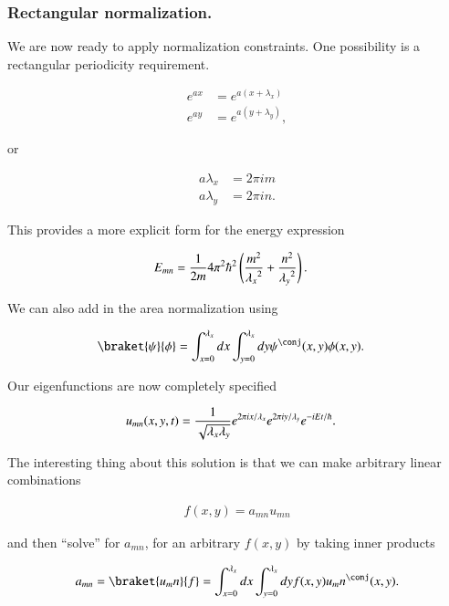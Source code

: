 \subsubsection{Rectangular normalization.}

We are now ready to apply normalization constraints.  One possibility is a rectangular periodicity requirement.

\begin{align}\label{eqn:desaiCh4:107}
e^{ax} &= e^{a(x + \lambda_x)} \\
e^{ay} &= e^{a(y + \lambda_y)} ,
\end{align}

or

\begin{align}\label{eqn:desaiCh4:108}
a\lambda_x &= 2 \pi i m \\
a\lambda_y &= 2 \pi i n.
\end{align}

This provides a more explicit form for the energy expression

\begin{align}\label{eqn:desaiCh4:109}
E_{mn} &= \frac{1}{2m} 4 \pi^2 \hbar^2 \left( 
\frac{m^2}{{\lambda_x}^2}
+\frac{n^2}{{\lambda_y}^2}
\right).
\end{align}

We can also add in the area normalization using 

\begin{align}\label{eqn:desaiCh4:110}
\braket{\psi}{\phi} &= 
\int_{x=0}^{\lambda_x} dx
\int_{y=0}^{\lambda_x} dy \psi^\conj(x,y) \phi(x,y).
\end{align}

Our eigenfunctions are now completely specified

\begin{align}\label{eqn:desaiCh4:111}
u_{mn}(x,y,t) &= \frac{1}{\sqrt{\lambda_x \lambda_y}}
e^{2 \pi i x/\lambda_x}
e^{2 \pi i y/\lambda_y}
e^{-iE t/\hbar}.
\end{align}

The interesting thing about this solution is that we can make arbitrary linear combinations

\begin{align}\label{eqn:desaiCh4:112}
f(x,y) = a_{mn} u_{mn}
\end{align}

and then ``solve'' for $a_{mn}$, for an arbitrary $f(x,y)$ by taking inner products

\begin{align}\label{eqn:desaiCh4:113}
a_{mn} = \braket{u_mn}{f} =
\int_{x=0}^{\lambda_x} dx 
\int_{y=0}^{\lambda_x} dy f(x,y) u_mn^\conj(x,y).
\end{align}

